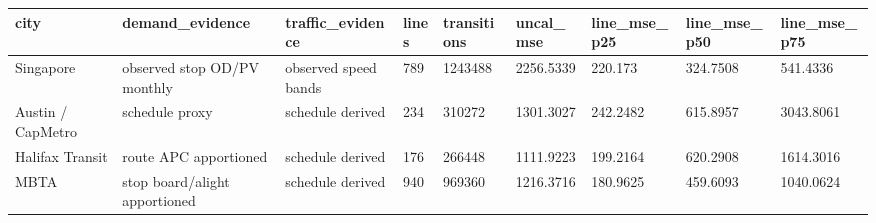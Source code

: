 \begin{tabular}{lllllllll}
\toprule
city & demand\_evidence & traffic\_evidence & lines & transitions & uncal\_mse & line\_mse\_p25 & line\_mse\_p50 & line\_mse\_p75 \\
\midrule
Singapore & observed stop OD/PV monthly & observed speed bands & 789 & 1243488 & 2256.5339 & 220.173 & 324.7508 & 541.4336 \\
Austin / CapMetro & schedule proxy & schedule derived & 234 & 310272 & 1301.3027 & 242.2482 & 615.8957 & 3043.8061 \\
Halifax Transit & route APC apportioned & schedule derived & 176 & 266448 & 1111.9223 & 199.2164 & 620.2908 & 1614.3016 \\
MBTA & stop board/alight apportioned & schedule derived & 940 & 969360 & 1216.3716 & 180.9625 & 459.6093 & 1040.0624 \\
\bottomrule
\end{tabular}
